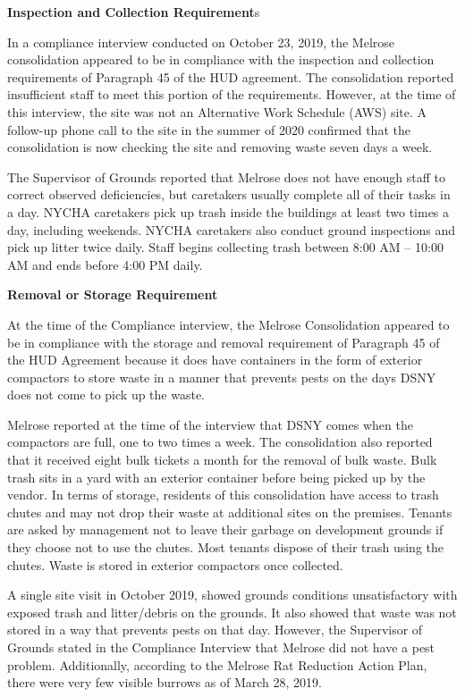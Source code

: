 
\textbf{Inspection and Collection Requirement}s

In a compliance interview conducted on October 23, 2019, the Melrose consolidation appeared to be in compliance with the inspection and collection requirements of Paragraph 45 of the HUD agreement. The consolidation reported insufficient staff to meet this portion of the requirements. However, at the time of this interview, the site was not an Alternative Work Schedule (AWS) site. A follow-up phone call to the site in the summer of 2020 confirmed that the consolidation is now checking the site and removing waste seven days a week.

The Supervisor of Grounds reported that Melrose does not have enough staff to correct observed deficiencies, but caretakers usually complete all of their tasks in a day. NYCHA caretakers pick up trash inside the buildings at least two times a day, including weekends. NYCHA caretakers also conduct ground inspections and pick up litter twice daily. Staff begins collecting trash between 8:00 AM -- 10:00 AM and ends before 4:00 PM daily.

\textbf{Removal or Storage Requirement}

At the time of the Compliance interview, the Melrose Consolidation appeared to be in compliance with the storage and removal requirement of Paragraph 45 of the HUD Agreement because it does have containers in the form of exterior compactors to store waste in a manner that prevents pests on the days DSNY does not come to pick up the waste.



Melrose reported at the time of the interview that DSNY comes when the compactors are full, one to two times a week. The consolidation also reported that it received eight bulk tickets a month for the removal of bulk waste. Bulk trash sits in a yard with an exterior container before being picked up by the vendor. In terms of storage, residents of this consolidation have access to trash chutes and may not drop their waste at additional sites on the premises. Tenants are asked by management not to leave their garbage on development grounds if they choose not to use the chutes. Most tenants dispose of their trash using the chutes. Waste is stored in exterior compactors once collected.



A single site visit in October 2019, showed grounds conditions unsatisfactory with exposed trash and litter/debris on the grounds. It also showed that waste was not stored in a way that prevents pests on that day. However, the Supervisor of Grounds stated in the Compliance Interview that Melrose did not have a pest problem. Additionally, according to the  Melrose Rat Reduction Action Plan, there were very few visible burrows as of March 28, 2019.

